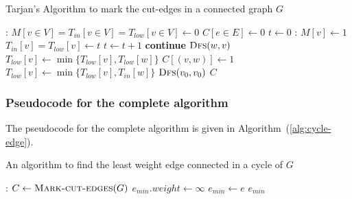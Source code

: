 \documentclass[12pt]{report}
\begin{document}
    \begin{algorithm}
        \caption{Tarjan's Algorithm to mark the cut-edges in a connected graph $G$}
        \label{alg:cut-edges}
        \begin{algorithmic}[1]
            :
                \State $M[v \in V] = T_{in}[v \in V] = T_{low}[v \in V] \gets 0$
                \State $C[e \in E] \gets 0$
                \State $t \gets 0$
                :
                    \State $M[v] \gets 1$
                    \State $T_{in}[v] = T_{low}[v] \gets t$
                    \State $t \gets t + 1$
                            \State \textbf{continue}
                            \State $\Call{Dfs}{w, v}$
                            \State $T_{low}[v] \gets \min{\{T_{low}[v], T_{low}[w]\}}$
                                \State $C[(v, w)] \gets 1$
                            \EndIf
                        \Else
                            \State $T_{low}[v] \gets \min{\{T_{low}[v], T_{in}[w]\}}$
                        \EndIf
                    \EndFor
                \EndProcedure
                \State $\Call{Dfs}{v_{0}, v_{0}}$ 
                \State \Return $C$
            \EndProcedure
        \end{algorithmic}
    \end{algorithm}

    \subsubsection*{Pseudocode for the complete algorithm}
    The pseudocode for the complete algorithm is given in Algorithm~(\ref{alg:cycle-edge}).
    \vfill

    \begin{algorithm}
        \caption{An algorithm to find the least weight edge connected in a cycle of $G$}
        \label{alg:cycle-edge}
        \begin{algorithmic}[1]
            :
                \State $C \gets \Call{Mark-cut-edges}{G}$
                \State $e_{min}.weight \gets \infty$
                            \State $e_{min} \gets e$
                        \EndIf
                    \EndIf
                \EndFor
                \State \Return $e_{min}$
            \EndProcedure
        \end{algorithmic}
    \end{algorithm}
\end{document}
